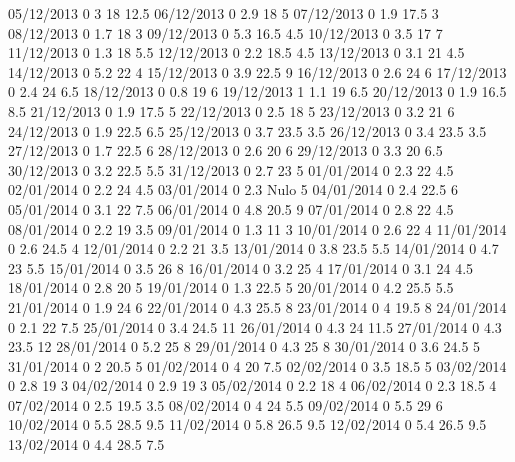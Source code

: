 05/12/2013  0      3      18     12.5 
06/12/2013  0      2.9    18     5 
07/12/2013  0      1.9    17.5   3 
08/12/2013  0      1.7    18     3 
09/12/2013  0      5.3    16.5   4.5 
10/12/2013  0      3.5    17     7 
11/12/2013  0      1.3    18     5.5 
12/12/2013  0      2.2    18.5   4.5 
13/12/2013  0      3.1    21     4.5 
14/12/2013  0      5.2    22     4 
15/12/2013  0      3.9    22.5   9 
16/12/2013  0      2.6    24     6 
17/12/2013  0      2.4    24     6.5 
18/12/2013  0      0.8    19     6 
19/12/2013  1      1.1    19     6.5 
20/12/2013  0      1.9    16.5   8.5 
21/12/2013  0      1.9    17.5   5 
22/12/2013  0      2.5    18     5 
23/12/2013  0      3.2    21     6 
24/12/2013  0      1.9    22.5   6.5 
25/12/2013  0      3.7    23.5   3.5 
26/12/2013  0      3.4    23.5   3.5 
27/12/2013  0      1.7    22.5   6 
28/12/2013  0      2.6    20     6 
29/12/2013  0      3.3    20     6.5 
30/12/2013  0      3.2    22.5   5.5 
31/12/2013  0      2.7    23     5 
01/01/2014  0      2.3    22     4.5 
02/01/2014  0      2.2    24     4.5 
03/01/2014  0      2.3   Nulo    5 
04/01/2014  0      2.4    22.5   6 
05/01/2014  0      3.1    22     7.5 
06/01/2014  0      4.8    20.5   9 
07/01/2014  0      2.8    22     4.5 
08/01/2014  0      2.2    19     3.5 
09/01/2014  0      1.3    11     3 
10/01/2014  0      2.6    22     4 
11/01/2014  0      2.6    24.5   4 
12/01/2014  0      2.2    21     3.5 
13/01/2014  0      3.8    23.5   5.5 
14/01/2014  0      4.7    23     5.5 
15/01/2014  0      3.5    26     8 
16/01/2014  0      3.2    25     4 
17/01/2014  0      3.1    24     4.5 
18/01/2014  0      2.8    20     5 
19/01/2014  0      1.3    22.5   5 
20/01/2014  0      4.2    25.5   5.5 
21/01/2014  0      1.9    24     6 
22/01/2014  0      4.3    25.5   8 
23/01/2014  0      4      19.5   8 
24/01/2014  0      2.1    22     7.5 
25/01/2014  0      3.4    24.5   11 
26/01/2014  0      4.3    24     11.5 
27/01/2014  0      4.3    23.5   12 
28/01/2014  0      5.2    25     8 
29/01/2014  0      4.3    25     8 
30/01/2014  0      3.6    24.5   5 
31/01/2014  0      2      20.5   5 
01/02/2014  0      4      20     7.5 
02/02/2014  0      3.5    18.5   5 
03/02/2014  0      2.8    19     3 
04/02/2014  0      2.9    19     3 
05/02/2014  0      2.2    18     4 
06/02/2014  0      2.3    18.5   4 
07/02/2014  0      2.5    19.5   3.5 
08/02/2014  0      4      24     5.5 
09/02/2014  0      5.5    29     6 
10/02/2014  0      5.5    28.5   9.5 
11/02/2014  0      5.8    26.5   9.5 
12/02/2014  0      5.4    26.5   9.5 
13/02/2014  0      4.4    28.5   7.5 
